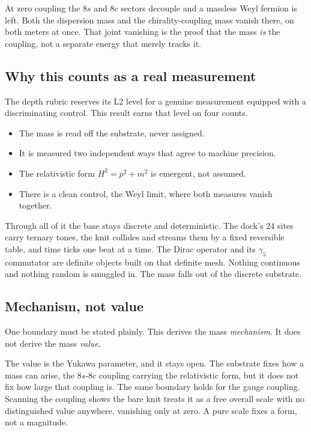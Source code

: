 \begin{result}
At zero coupling the $8s$ and $8c$ sectors decouple and a massless Weyl fermion is left. Both the dispersion mass and the chirality-coupling mass vanish there, on both meters at once. That joint vanishing is the proof that the mass \emph{is} the coupling, not a separate energy that merely tracks it.
\end{result}

\subsection{Why this counts as a real measurement}

The depth rubric reserves its L2 level for a genuine measurement equipped with a discriminating control. This result earns that level on four counts.

\begin{itemize}
\item The mass is read off the substrate, never assigned.
\item It is measured two independent ways that agree to machine precision.
\item The relativistic form $H^2 = p^2 + m^2$ is emergent, not assumed.
\item There is a clean control, the Weyl limit, where both measures vanish together.
\end{itemize}

Through all of it the base stays discrete and deterministic. The dock's $24$ sites carry ternary tones, the knit collides and streams them by a fixed reversible table, and time ticks one beat at a time. The Dirac operator and its $\gamma_5$ commutator are definite objects built on that definite mesh. Nothing continuous and nothing random is smuggled in. The mass falls out of the discrete substrate.

\subsection{Mechanism, not value}

One boundary must be stated plainly. This derives the mass \emph{mechanism}. It does not derive the mass \emph{value}.

The value is the Yukawa parameter, and it stays open. The substrate fixes how a mass can arise, the $8s$-$8c$ coupling carrying the relativistic form, but it does not fix how large that coupling is. The same boundary holds for the gauge coupling. Scanning the coupling shows the bare knit treats it as a free overall scale with no distinguished value anywhere, vanishing only at zero. A pure scale fixes a form, not a magnitude.

